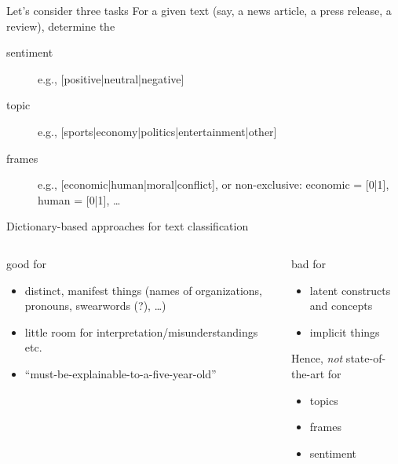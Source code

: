 \begin{frame}{Let's consider three tasks}
  For a given text (say, a news article, a press release, a review), determine the
  \begin{description}
  \item[sentiment] e.g., [positive|neutral|negative]
  \item[topic] e.g., [sports|economy|politics|entertainment|other]
  \item[frames] e.g., [economic|human|moral|conflict], or non-exclusive: economic = [0|1], human = [0|1], \ldots
  \end{description}
\end{frame}






\begin{frame}{Dictionary-based approaches for text classification}
  \begin{columns}[t]
    \begin{block}{good for}
      \begin{itemize}
      \item distinct, manifest things (names of organizations, pronouns, swearwords (?), \ldots)
      \item little room for interpretation/misunderstandings etc.
      \item ``must-be-explainable-to-a-five-year-old''
      \end{itemize}
      \pause
    \end{block}
    \begin{alertblock}{bad for}
      \begin{itemize}
      \item latent constructs and concepts
      \item implicit things
      \end{itemize}
      \pause
      Hence, \emph{not} state-of-the-art for
      \begin{itemize}
      \item topics
      \item frames
      \item sentiment
      \end{itemize}
    \end{alertblock}
  \end{columns}
\end{frame}



